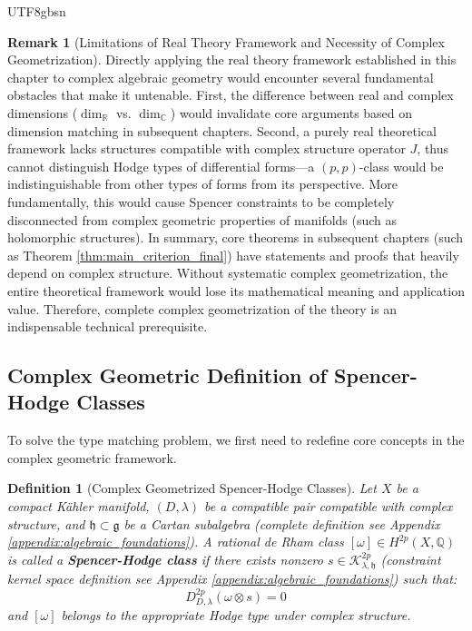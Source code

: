 \documentclass[a4paper,12pt]{extarticle}
\newtheorem{definition}[theorem]{Definition}
\theoremstyle{definition}
\newtheorem{remark}{Remark}[section]
\begin{document}
\begin{CJK}{UTF8}{gbsn}
\begin{remark}[Limitations of Real Theory Framework and Necessity of Complex Geometrization]
\label{rem:real_framework_limitations}
Directly applying the real theory framework established in this chapter to complex algebraic geometry would encounter several fundamental obstacles that make it untenable. First, the difference between real and complex dimensions ($\dim_{\mathbb{R}}$ vs. $\dim_{\mathbb{C}}$) would invalidate core arguments based on dimension matching in subsequent chapters. Second, a purely real theoretical framework lacks structures compatible with complex structure operator $J$, thus cannot distinguish Hodge types of differential forms—a $(p,p)$-class would be indistinguishable from other types of forms from its perspective. More fundamentally, this would cause Spencer constraints to be completely disconnected from complex geometric properties of manifolds (such as holomorphic structures). In summary, core theorems in subsequent chapters (such as Theorem \ref{thm:main_criterion_final}) have statements and proofs that heavily depend on complex structure. Without systematic complex geometrization, the entire theoretical framework would lose its mathematical meaning and application value. Therefore, complete complex geometrization of the theory is an indispensable technical prerequisite.
\end{remark}

\subsection{Complex Geometric Definition of Spencer-Hodge Classes}
\label{subsec:spencer_hodge_complex_definition}

To solve the type matching problem, we first need to redefine core concepts in the complex geometric framework.

\begin{definition}[Complex Geometrized Spencer-Hodge Classes]
\label{def:spencer_hodge_complex}
Let $X$ be a compact Kähler manifold, $(D,\lambda)$ be a compatible pair compatible with complex structure, and $\mathfrak{h} \subset \mathfrak{g}$ be a Cartan subalgebra (complete definition see Appendix \ref{appendix:algebraic_foundations}). A rational de Rham class $[\omega] \in H^{2p}(X, \mathbb{Q})$ is called a \textbf{Spencer-Hodge class} if there exists nonzero $s \in \mathcal{K}^{2p}_{\lambda,\mathfrak{h}}$ (constraint kernel space definition see Appendix \ref{appendix:algebraic_foundations}) such that:
\begin{equation}
\label{eq:spencer_hodge_condition}
D^{2p}_{D,\lambda}(\omega \otimes s) = 0
\end{equation}
and $[\omega]$ belongs to the appropriate Hodge type under complex structure.
\end{definition}


\end{CJK}
\end{document}
